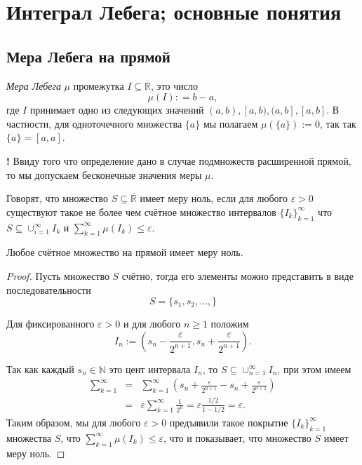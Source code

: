 \chapter{Интеграл Лебега; основные понятия}


\section{Мера Лебега на прямой}

\begin{definition}
   \textit{Мера Лебега} $\mu$ промежутка $I \subseteq \overline{\mathbb{R}}$, это число
    \[
     \mu(I): = b-a,
    \]
    где $I$ принимает одно из следующих значений $(a,b), [a,b), (a,b], [a,b]$. В частности, для одноточечного множества $\{a\}$ мы полагаем $\mu(\{a\}):=0$, так так $\{a\} = [a,a]$.
\end{definition}

\begin{mydangerr}{\bf!}
    Ввиду того что определение дано в случае подмножеств расширенной прямой, то мы допускаем бесконечные значения меры $\mu$.
\end{mydangerr}

\begin{definition}
    Говорят, что множество $S \subseteq \overline{\mathbb{R}}$ имеет меру ноль, если для любого $\varepsilon>0$ существуют такое не более чем счётное множество интервалов $\{I_k\}_{k=1}^\infty$ что $S \subseteq \cup_{i=1}^\infty I_k$ и $\sum_{k=1}^\infty \mu(I_k) \le \varepsilon.$
\end{definition}

\begin{lemma}
    Любое счётное множество на прямой имеет меру ноль.
\end{lemma}
\begin{proof}
 Пусть множество $S$ счётно, тогда его элементы можно представить в виде последовательности
 \[
  S= \{s_1,s_2,\ldots,\}
 \]

Для фиксированного $\varepsilon>0$ и для любого $n\ge 1$ положим
    \[
     I_n:=\left( s_n-\frac{\varepsilon}{2^{n+1}}, s_n + \frac{\varepsilon}{2^{n+1}}\right).
    \]

 Так как каждый $s_n\in \mathbb{N}$ это цент интервала $I_n$, то $S \subseteq \cup_{n=1}^\infty I_n$, при этом имеем
    \begin{eqnarray*}
        \sum_{k=1}^\infty &=& \sum_{k=1}^\infty \left( s_n + \frac{\varepsilon}{2^{n+1}} - s_n +\frac{\varepsilon}{2^{n+1}} \right) \\
        &=& \varepsilon \sum_{k=1}^\infty \frac{1}{2^n} = \varepsilon \frac{1/2}{1-1/2} = \varepsilon.        
    \end{eqnarray*}
Таким образом, мы для любого $\varepsilon>0$ предъявили такое покрытие $\{I_k\}_{k=1}^\infty$ множества $S$, что $\sum_{k=1}^\infty \mu(I_k) \le \varepsilon$, что и показывает, что множество $S$ имеет меру ноль.
\end{proof}


